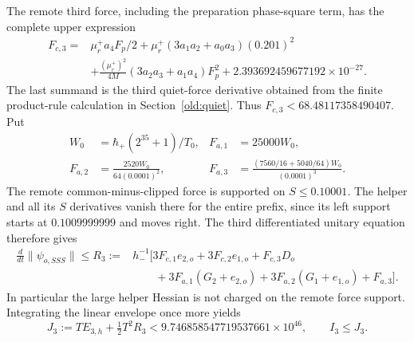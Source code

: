 \documentclass[11pt]{article}
\theoremstyle{definition}\newtheorem{definition}[theorem]{Definition}
\theoremstyle{remark}\newtheorem{remark}[theorem]{Remark}
\begin{document}
The remote third force, including the preparation phase-square term,
has the complete upper expression
\begin{align}
 F_{c,3}={}&\mu_r^+a_4F_p/2
  +\mu_r^+(3a_1a_2+a_0a_3)(0.201)^2\nonumber\\
 &+\frac{(\mu_r^+)^2}{4M}(3a_2a_3+a_1a_4)F_p^2
                      +2.393692459677192\times10^{-27}.
 \label{prefix:Fc3}
\end{align}
The last summand is the third quiet-force derivative obtained from the
finite product-rule calculation in Section~\ref{old:quiet}.
Thus $F_{c,3}<68.48117358490407$.
Put
\[
 \begin{aligned}
 W_0&=\hbar_+(2^{35}+1)/T_0,&F_{a,1}&=25000W_0,\\
 F_{a,2}&=\frac{2520W_0}{64(0.0001)^2},&
 F_{a,3}&=\frac{(7560/16+5040/64)W_0}{(0.0001)^3}.
 \end{aligned}
\]
The remote common-minus-clipped force is supported on $S\le0.10001$.
The helper and all its $S$ derivatives vanish there for the entire
prefix, since its left support starts at $0.1009999999$ and moves right.
The third differentiated unitary equation therefore gives
\begin{align*}
 \frac{d}{dt}\|\psi_{o,SSS}\|\le R_3:={}&
 h_-^{-1}\bigl[3F_{c,1}e_{2,o}+3F_{c,2}e_{1,o}+F_{c,3}D_o\\
 &\qquad+3F_{a,1}(G_2+e_{2,o})
       +3F_{a,2}(G_1+e_{1,o})+F_{a,3}\bigr].
\end{align*}
In particular the large helper Hessian is not charged on the remote
force support.  Integrating the linear envelope once more yields
\begin{equation}
 J_3:=TE_{3,h}+\tfrac12T^2R_3
 <9.746858547719537661\times10^{46},\qquad I_3\le J_3.
 \label{prefix:J3}
\end{equation}
\end{document}

